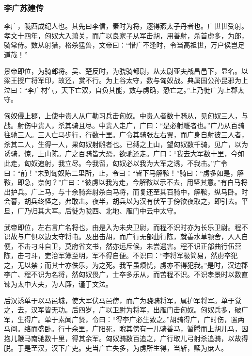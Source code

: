 \documentclass[]{article}
\begin{document}
\hypertarget{header-n4405}{%
\subsubsection{李广苏建传}\label{header-n4405}}

李广，陇西成纪人也。其先曰李信，秦时为将，逐得燕太子丹者也。广世世受射。孝文十四年，匈奴大入萧关，而广以良家子从军击胡，用善射，杀首虏多，为郎，骑常侍。数从射猎，格杀猛兽，文帝曰：``惜广不逢时，令当高祖世，万户侯岂足道哉！''

景帝即位，为骑郎将。吴、楚反时，为骁骑都尉，从太尉亚夫战昌邑下，显名。以梁王授广将军印，故还，赏不行。为上谷太守，数与匈奴战。典属国公孙昆邪为上泣曰：``李广材气，天下亡双，自负其能，数与虏确，恐亡之。''上乃徙广为上郡太守。

匈奴侵上郡，上使中贵人从广勒习兵击匈奴。中贵人者数十骑从，见匈奴三人，与战。射伤中贵人，杀其骑且尽。中贵人走广，广曰：``是必射雕者也。''广乃从百骑往驰三人。三人亡马步行，行数十里。广令其骑张左右翼，而广身自射彼三人者，杀其二人，生得一人，果匈奴射雕者也。已缚之上山，望匈奴数千骑，见广，以为诱骑，惊，上山陈。广之百骑皆大恐，欲驰还走。广曰：``我去大军数十里，今如此走，匈奴追射，我立尽。今我留，匈奴必以我为大军之诱，不我击。''广令曰：``前！''未到匈奴陈二里所，止，令曰：``皆下马解鞍！''骑曰：``虏多如是，解鞍，即急，奈何？''广曰：``彼虏以我为走，今解鞍以示不去，用坚其意。''有白马将出护兵。广上马，与十余骑奔射杀白马将，而复还至其百骑中，解鞍，纵马卧。时会暮，胡兵终怪之，弗敢击。夜半，胡兵以为汉有伏军于傍欲夜取之，即引去。平旦，广乃归其大军。后徙为陇西、北地、雁门中云中太守。

武帝即位，左右言广名将也，由是入为未央卫尉，而程不识时亦为长乐卫尉。程不识故与广俱以边太守将屯。及出击胡，而广行无部曲行陈，就善水草顿舍，人人自便，不击刁斗自卫，莫府省文书，然亦远斥候，未尝遇害。程不识正部曲行伍营陈，击刁斗，吏治军簿至明，军不得自便。不识曰：``李将军极简易，然虏卒犯之，无以禁；而其士亦佚乐，为之死。我军虽烦忧，虏亦不得犯我。''是时，汉边郡李广、程不识为名将，然匈奴畏广，士卒多乐从，而苦程不识。不识孝景时以数直谏为太中大夫，为人廉，谨于文法。

后汉诱单于以马邑城，使大军伏马邑傍，而广为骁骑将军，属护军将军。单于觉之，去，汉军皆无功。后四岁，广以卫尉为将军，出雁门击匈奴。匈奴兵多，破广军，生得广。单于素闻广贤，令曰：``得李广必生致之。''胡骑得广，广时伤，置两马间。络而盛卧。行十余里，广阳死，睨其傍有一儿骑善马，暂腾而上胡儿马，因抱儿鞭马南驰数十里，得其余军。匈奴骑数百追之，广行取儿弓射杀追骑，以故得脱。于是至汉，汉下广吏。吏当广亡失多，为虏所生得，当斩，赎为庶人。
\end{document}

